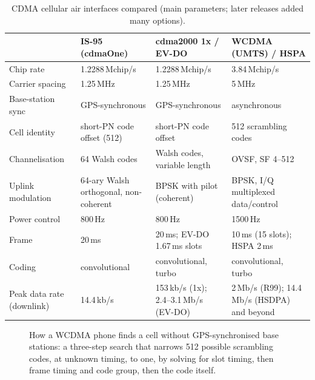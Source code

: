 \begin{table}[htbp]\centering\small
\caption{CDMA cellular air interfaces compared (main parameters; later releases added many
options).}
\label{tab:ch18:cdma}
\begin{tabularx}{\linewidth}{@{}l X X X@{}}
\toprule
& IS-95 (cdmaOne) & cdma2000 1x / EV-DO & WCDMA (UMTS) / HSPA\\
\midrule
Chip rate & 1.2288\,Mchip/s & 1.2288\,Mchip/s & 3.84\,Mchip/s\\
Carrier spacing & 1.25\,MHz & 1.25\,MHz & 5\,MHz\\
Base-station sync & GPS-synchronous & GPS-synchronous & asynchronous\\
Cell identity & short-PN code offset (512) & short-PN code offset & 512 scrambling codes\\
Channelisation & 64 Walsh codes & Walsh codes, variable length & OVSF, SF 4--512\\
Uplink modulation & 64-ary Walsh orthogonal, non-coherent & BPSK with pilot (coherent) & BPSK, I/Q multiplexed data/control\\
Power control & 800\,Hz & 800\,Hz & 1500\,Hz\\
Frame & 20\,ms & 20\,ms; EV-DO 1.67\,ms slots & 10\,ms (15 slots); HSPA 2\,ms\\
Coding & convolutional & convolutional, turbo & convolutional, turbo\\
Peak data rate (downlink) & 14.4\,kb/s & 153\,kb/s (1x); 2.4--3.1\,Mb/s (EV-DO) & 2\,Mb/s (R99); 14.4\,Mb/s (HSDPA) and beyond\\
\bottomrule
\end{tabularx}
\end{table}

\begin{figure}[htbp]\centering
{}
\caption{How a WCDMA phone finds a cell without GPS-synchronised base stations: a three-step search
that narrows 512 possible scrambling codes, at unknown timing, to one, by solving for slot timing,
then frame timing and code group, then the code itself.}
\label{fig:ch18_wcdma_search}
\end{figure}

